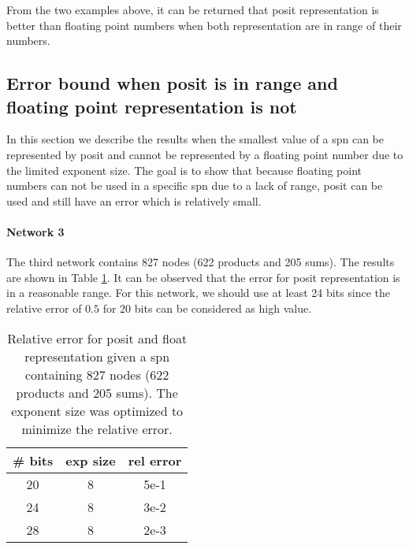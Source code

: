 From the two examples above, it can be returned that posit representation is better than floating point numbers when both representation are in range of their numbers.



\subsection{Error bound when posit is in range and floating point representation is not}
In this section we describe the results when the smallest value of a \gls{spn} can be represented by posit and cannot be represented by a floating point number due to the limited exponent size. The goal is to show that because floating point numbers can not be used in a specific \gls{spn} due to a lack of range, posit can be used and still have an error which is relatively small.

\paragraph{Network 3}

The third network contains 827 nodes (622 products and 205 sums). The results are shown in Table \ref{tab:net3_res}. It can be observed that the error for posit representation is in a reasonable range. For this network, we should use at least 24 bits since the relative error of $0.5$ for 20 bits can be considered as high value.

\begin{table}[!ht]
	\centering
	\caption{Relative error for posit and float representation given a \gls{spn} containing 827 nodes (622 products and 205 sums). The exponent size was optimized to minimize the relative error.}
	\label{tab:net3_res}
	\begin{tabular}{|c||c|c|}
	\hline
		\# bits & exp size & rel error \\
	\hline
		20 & 8 & 5e-1 \\
		24 & 8 & 3e-2 \\
		28 & 8 & 2e-3 \\
	\hline
	\end{tabular}
\end{table}


